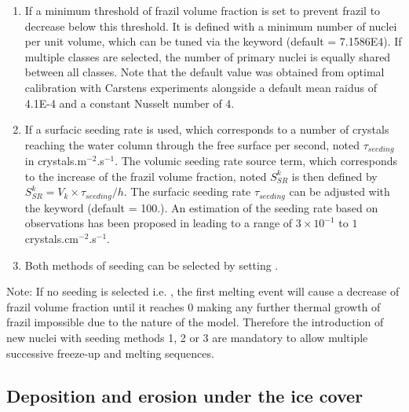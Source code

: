 \begin{enumerate}
\item If  a minimum threshold of frazil volume fraction
is set to prevent frazil to decrease below this threshold. It is defined with a
minimum number of nuclei per unit volume, which can be tuned via the keyword
 (default = 7.1586E4). If multiple classes are selected,
the number of primary nuclei is equally shared between all classes. Note that the default value was obtained from optimal calibration with Carstens experiments \cite{carstens_1966} alongside a default mean raidus of 4.1E-4 and a constant Nusselt number of 4. 

\item If  a surfacic seeding rate is used, which corresponds
to a number of crystals reaching the water column through the free surface per second, noted $\tau_{seeding}$ in crystals.m$^{-2}$.s$^{-1}$.
The volumic seeding rate source term, which corresponds to the increase of the frazil volume fraction, noted $S^k_{SR}$ is then defined by $S^k_{SR} = V_k \times \tau_{seeding} /h$.
The surfacic seeding rate $\tau_{seeding}$ can be adjusted with the keyword
 (default = 100.). An estimation of the seeding rate based on observations has been proposed in \cite{daly_1994} leading to a range of $3 \times 10^{-1}$ to $1$ crystals.cm$^{-2}$.s$^{-1}$.

\item Both methods of seeding can be selected by setting .
\end{enumerate}

\begin{WarningBlock}{Note:}
    If no seeding is selected i.e. ,
    the first melting event will cause a decrease of frazil volume fraction
    until it reaches $0$ making any further thermal growth of frazil impossible
    due to the nature of the model.
    Therefore the introduction of new nuclei with seeding methods 1, 2 or 3 are mandatory
    to allow multiple successive freeze-up and melting sequences.
\end{WarningBlock}

\subsection{Deposition and erosion under the ice cover}
\label{section:precipitation}

